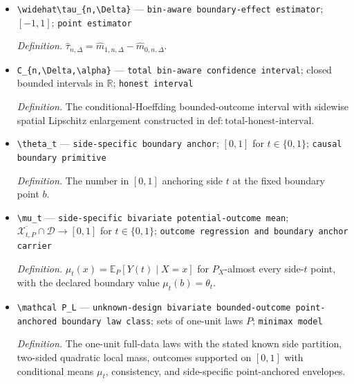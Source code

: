 \documentclass{article}
\begin{document}
\begin{itemize}
  \par\smallskip\noindent\emph{Definition.} The observed-count ratio with fixed zero-count fallback constructed in \(\mathrm{def:bin\text{-}aware\text{-}estimator}\).
  \item \texttt{\textbackslash{}\allowbreak{}widehat\textbackslash{}\allowbreak{}tau\_\allowbreak{}\{n,\allowbreak{}\textbackslash{}\allowbreak{}Delta\}\allowbreak{}} --- \texttt{bin-\allowbreak{}aware boundary-\allowbreak{}effect estimator}; \([-1,1]\); \texttt{point estimator}
  \par\smallskip\noindent\emph{Definition.} \(\widehat\tau_{n,\Delta}=\widehat m_{1,n,\Delta}-\widehat m_{0,n,\Delta}\).
  \item \texttt{C\_\allowbreak{}\{n,\allowbreak{}\textbackslash{}\allowbreak{}Delta,\allowbreak{}\textbackslash{}\allowbreak{}alpha\}\allowbreak{}} --- \texttt{total bin-\allowbreak{}aware confidence interval}; closed bounded intervals in \(\mathbb R\); \texttt{honest interval}
  \par\smallskip\noindent\emph{Definition.} The conditional-Hoeffding bounded-outcome interval with sidewise spatial Lipschitz enlargement constructed in \(\mathrm{def:total\text{-}honest\text{-}interval}\).
  \item \texttt{\textbackslash{}\allowbreak{}theta\_\allowbreak{}t} --- \texttt{side-\allowbreak{}specific boundary anchor}; \([0,1]\) for \(t\in\{0,1\}\); \texttt{causal boundary primitive}
  \par\smallskip\noindent\emph{Definition.} The number in \([0,1]\) anchoring side \(t\) at the fixed boundary point \(b\).
  \item \texttt{\textbackslash{}\allowbreak{}mu\_\allowbreak{}t} --- \texttt{side-\allowbreak{}specific bivariate potential-\allowbreak{}outcome mean}; \(\overline{\mathcal X_{t,P}}\cap\mathcal D\to[0,1]\) for \(t\in\{0,1\}\); \texttt{outcome regression and boundary anchor carrier}
  \par\smallskip\noindent\emph{Definition.} \(\mu_t(x)=\mathbb E_P[Y(t)\mid X=x]\) for \(P_X\)-almost every side-\(t\) point, with the declared boundary value \(\mu_t(b)=\theta_t\).
  \item \texttt{\textbackslash{}\allowbreak{}mathcal P\_\allowbreak{}L} --- \texttt{unknown-\allowbreak{}design bivariate bounded-\allowbreak{}outcome point-\allowbreak{}anchored boundary law class}; sets of one-unit laws \(P\); \texttt{minimax model}
  \par\smallskip\noindent\emph{Definition.} The one-unit full-data laws with the stated known side partition, two-sided quadratic local mass, outcomes supported on \([0,1]\) with conditional means \(\mu_t\), consistency, and side-specific point-anchored envelopes.

\end{itemize}
\end{document}

